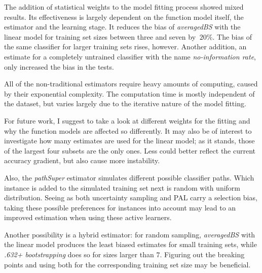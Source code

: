The addition of statistical weights to the model fitting process showed mixed results. Its effectiveness is largely dependent on the function model itself, the estimator and the learning stage. It reduces the bias of \textit{averagedBS} with the linear model for training set sizes between three and seven by $~20\%$. The bias of the same classifier for larger training sets rises, however. Another addition, an estimate for a completely untrained classifier with the name \textit{no-information rate}, only increased the bias in the tests.

All of the non-traditional estimators require heavy amounts of computing, caused by their exponential complexity. The computation time is mostly independent of the dataset, but varies largely due to the iterative nature of the model fitting.

For future work, I suggest to take a look at different weights for the fitting and why the function models are affected so differently. It may also be of interest to investigate how many estimates are used for the linear model; as it stands, those of the largest four subsets are the only ones. Less could better reflect the current accuracy gradient, but also cause more instability.

Also, the \textit{pathSuper} estimator simulates different possible classifier paths. Which instance is added to the simulated training set next is random with uniform distribution. Seeing as both uncertainty sampling and PAL carry a selection bias, taking these possible preferences for instances into account may lead to an improved estimation when using these active learners.

Another possibility is a hybrid estimator: for random sampling, \textit{averagedBS} with the linear model produces the least biased estimates for small training sets, while \textit{.632+ bootstrapping} does so for sizes larger than $7$. Figuring out the breaking points and using both for the corresponding training set size may be beneficial.